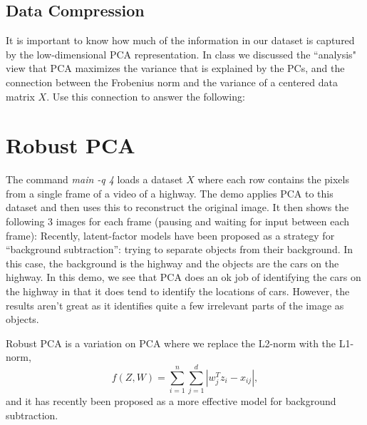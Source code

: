 \documentclass{article}
\begin{document}
\subsection{Data Compression}

It is important to know how much of the information in our dataset is captured by the low-dimensional PCA representation.
In class we discussed the ``analysis" view that PCA maximizes the variance that is explained by the PCs, and the connection between the Frobenius norm and the variance of a centered data matrix $X$. Use this connection to answer the following:


\section{Robust PCA}


The command \emph{main -q 4} loads a dataset $X$ where each row contains the pixels from a single frame of a video of a highway. The demo applies PCA to this dataset and then uses this to reconstruct the original image. 
It then shows the following 3 images for each frame (pausing and waiting for input between each frame):
Recently, latent-factor models have been proposed as a strategy for ``background subtraction'': trying to separate objects from their background. In this case, the background is the highway and the objects are the cars on the highway. In this demo, we see that PCA does an ok job of identifying the cars on the highway in that it does tend to identify the locations of cars. However, the results aren't great as it identifies quite a few irrelevant parts of the image as objects.

Robust PCA is a variation on PCA where we replace the L2-norm with the L1-norm,
\[
f(Z,W) = \sum_{i=1}^n\sum_{j=1}^d |w_j^Tz_i - x_{ij}|,
\]
and it has recently been proposed as a more effective model for background subtraction. 
\end{document}
